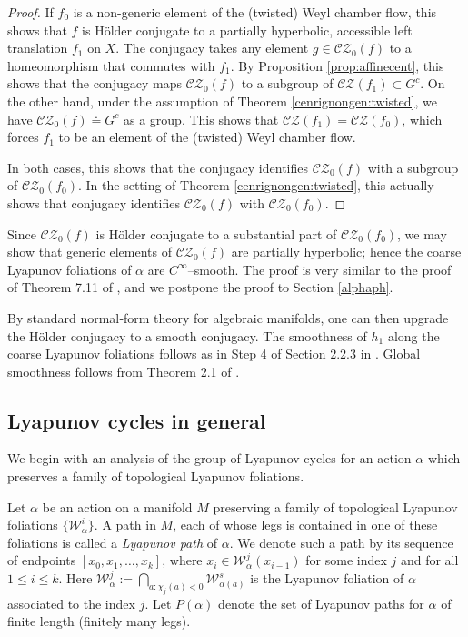 \documentclass[11pt]{amsart}
\numberwithin{equation}{section}
\newcommand{\CZ}{\mathcal{CZ}}
\theoremstyle{plain}
\begin{document}
\begin{proof}
If $f_0$ is a non-generic element of the (twisted) Weyl chamber flow, this shows that $f$ is H\"older conjugate to a partially hyperbolic, accessible left translation $f_1$ on $X$. The conjugacy takes any element $g\in \CZ_0(f)$ to a homeomorphism that commutes with $f_1$. By Proposition \ref{prop:affinecent}, this shows that the conjugacy maps $\CZ_0(f)$ to a subgroup of $\CZ(f_1)\subset G^c$. On the other hand, under the assumption of Theorem \ref{cenrignongen:twisted}, we have $\CZ_0(f)\doteq G^c$ as a group. This shows that $\CZ(f_1)=\CZ(f_0)$, which forces $f_1$ to be an element of the (twisted) Weyl chamber flow. 

In both cases, this shows that the conjugacy identifies $\CZ_0(f)$ with a subgroup of $\CZ_0(f_0)$. In the setting of Theorem \ref{cenrignongen:twisted}, this actually shows that conjugacy identifies $\CZ_0(f)$ with $\CZ_0(f_0)$.
\end{proof}

Since $\CZ_0(f)$ is H\"older conjugate to a substantial part of $\CZ_0(f_0)$, we may show that generic elements of $\CZ_0(f)$ are
partially hyperbolic; hence the coarse Lyapunov foliations of $\alpha$
are $C^\infty$–smooth. The proof is very similar to the proof of Theorem 7.11 of \cite{Wang}, and we postpone the proof to Section \ref{alphaph}.

By standard normal‑form theory for algebraic
manifolds, one can then upgrade the H\"older conjugacy to a smooth conjugacy. The
smoothness of $h_1$ along the coarse Lyapunov foliations follows as in
Step 4 of Section 2.2.3 in \cite{KS}. Global smoothness follows from
Theorem 2.1 of \cite{KSpat}. 


\subsection{Lyapunov cycles in general}

We begin with an analysis of the group of Lyapunov cycles for an action
$\alpha$ which preserves a family of topological Lyapunov foliations.

Let $\alpha$ be an action on a manifold $M$ preserving a family of
topological Lyapunov foliations $\{\mathcal W^i_\alpha\}$. A path in
$M$, each of whose legs is contained in one of these foliations is called a
\emph{Lyapunov path} of $\alpha$. We denote such a path by its sequence
of endpoints $[x_0,x_1,\dots,x_k]$, where $x_i\in\mathcal W^{j}_\alpha(x_{i-1})$
for some index $j$ and for all $1\le i\le k$. Here
$\mathcal W^j_\alpha:=\bigcap_{a:\chi_j(a)<0}\mathcal W^s_{\alpha(a)}$
is the Lyapunov foliation of $\alpha$ associated to the index $j$. Let
$P(\alpha)$ denote the set of Lyapunov paths for $\alpha$ of finite
length (finitely many legs).
\end{document}
